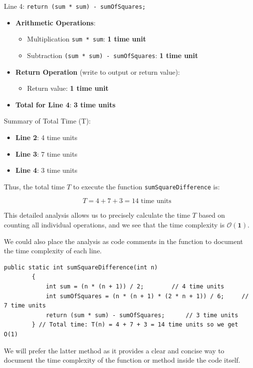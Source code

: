 \begin{example}
    Line 4: \texttt{return (sum * sum) - sumOfSquares;}
    \begin{itemize}
        \item \textbf{Arithmetic Operations}:
            \begin{itemize}
                \item Multiplication \texttt{sum * sum}: \textbf{1 time unit}
                \item Subtraction \texttt{(sum * sum) - sumOfSquares}: \textbf{1 time unit}
            \end{itemize}
        \item \textbf{Return Operation} (write to output or return value): 
            \begin{itemize}
                \item Return value: \textbf{1 time unit}
            \end{itemize}
        \item \textbf{Total for Line 4}: \textbf{3 time units}
    \end{itemize}

    Summary of Total Time (T):
    \begin{itemize}
        \item \textbf{Line 2}: 4 time units
        \item \textbf{Line 3}: 7 time units
        \item \textbf{Line 4}: 3 time units
    \end{itemize}

    Thus, the total time $T$ to execute the function \texttt{sumSquareDifference} is:

    \[
    T = 4 + 7 + 3 = 14 \text{ time units}
    \]

    This detailed analysis allows us to precisely calculate the time $T$ based on counting all individual operations, and we see that the time complexity is $\boldsymbol{\mathcal{O}(1)}$.

    We could also place the analysis as code comments in the function to document the time complexity of each line.

    \begin{lstlisting}[style=javaStyle, caption={Simple Function}, label={lst:java_simple_function2}]
        public static int sumSquareDifference(int n)
        {
            int sum = (n * (n + 1)) / 2;        // 4 time units
            int sumOfSquares = (n * (n + 1) * (2 * n + 1)) / 6;     // 7 time units
            return (sum * sum) - sumOfSquares;      // 3 time units
        } // Total time: T(n) = 4 + 7 + 3 = 14 time units so we get O(1)
    \end{lstlisting}
    
We will prefer the latter method as it provides a clear and concise way to document the time complexity of the function or method inside the code itself.
        
\end{example}

